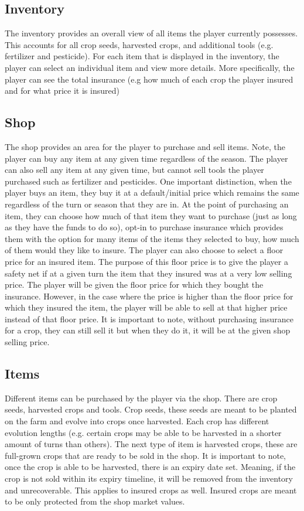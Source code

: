 \documentclass{article}
\begin{document}
\subsection{Inventory}
The inventory provides an overall view of all items the player currently possesses. This accounts for all crop seeds, harvested crops, and additional tools (e.g. fertilizer and pesticide). For each item that is displayed in the inventory, the player can select an individual item and view more details. More specifically, the player can see the total insurance (e.g how much of each crop the player insured and for what price it is insured)

\subsection{Shop}
The shop provides an area for the player to purchase and sell items. Note, the player can buy any item at any given time regardless of the season. The player can also sell any item at any given time, but cannot sell tools the player purchased such as fertilizer and pesticides. One important distinction, when the player buys an item, they buy it at a default/initial price which remains the same regardless of the turn or season that they are in. At the point of purchasing an item, they can choose how much of that item they want to purchase (just as long as they have the funds to do so), opt-in to purchase insurance which provides them with the option for many items of the items they selected to buy, how much of them would they like to insure. The player can also choose to select a floor price for an insured item. The purpose of this floor price is to give the player a safety net if at a given turn the item that they insured was at a very low selling price. The player will be given the floor price for which they bought the insurance. However, in the case where the price is higher than the floor price for which they insured the item, the player will be able to sell at that higher price instead of that floor price. It is important to note, without purchasing insurance for a crop, they can still sell it but when they do it, it will be at the given shop selling price.

\subsection{Items}
Different items can be purchased by the player via the shop. There are crop seeds, harvested crops and tools. Crop seeds, these seeds are meant to be planted on the farm and evolve into crops once harvested. Each crop has different evolution lengths (e.g. certain crops may be able to be harvested in a shorter amount of turns than others). The next type of item is harvested crops, these are full-grown crops that are ready to be sold in the shop. It is important to note, once the crop is able to be harvested, there is an expiry date set. Meaning, if the crop is not sold within its expiry timeline, it will be removed from the inventory and unrecoverable. This applies to insured crops as well. Insured crops are meant to be only protected from the shop market values. 
\end{document}
